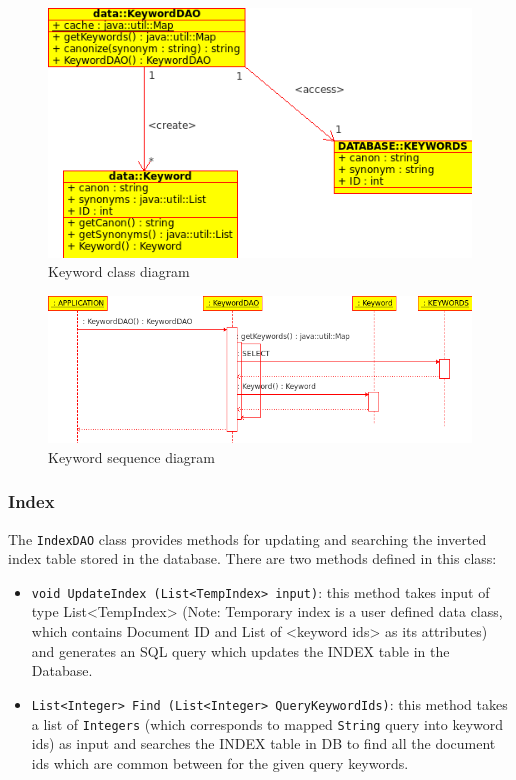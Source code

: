 \documentclass[10pt]{report}
\begin{document}
\begin{figure}
  \begin{center}
        \includegraphics[width=\textwidth,height=!]{keywordclassdiagram}
  \end{center}
  \caption{Keyword class diagram}
  \label{fig:keywordclassdiagram}
\end{figure} 

\begin{figure}
  \begin{center}
        \includegraphics[width=\textwidth,height=!]{keywordsequencediagram}
  \end{center}
  \caption{Keyword sequence diagram}
  \label{fig:keywordsequencediagram}
\end{figure} 


\subsubsection{Index}
The \texttt{IndexDAO} class provides methods for updating and
searching the inverted index table stored in the database. There are
two methods defined in this class: 

\begin{itemize}
\item \texttt{void UpdateIndex (List<TempIndex> input)}: this method
  takes input of type List<TempIndex> (Note: Temporary index is a user
  defined data class, which contains Document ID and List of <keyword
  ids> as its attributes) and generates an SQL query which updates the
  INDEX table in the Database. 

\item \texttt{List<Integer> Find (List<Integer> QueryKeywordIds)}:
  this method takes a list of \texttt{Integers} (which corresponds to
  mapped \texttt{String} query into keyword ids) as input and searches
  the INDEX table in DB to find all the document ids which are common
  between for the given query keywords. 
\end{itemize}
\end{document}
